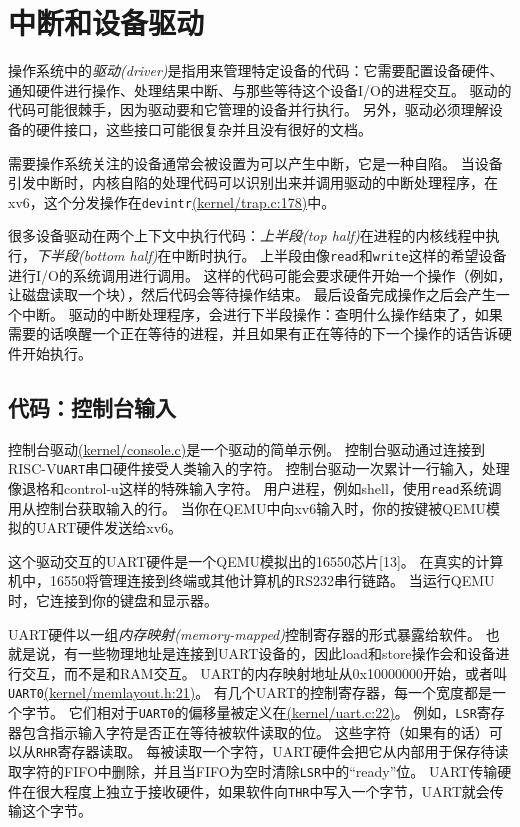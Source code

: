 \chapter{中断和设备驱动}

操作系统中的\emph{驱动(driver)}是指用来管理特定设备的代码：它需要配置设备硬件、通知硬件进行操作、处理结果中断、与那些等待这个设备I/O的进程交互。
驱动的代码可能很棘手，因为驱动要和它管理的设备并行执行。
另外，驱动必须理解设备的硬件接口，这些接口可能很复杂并且没有很好的文档。

需要操作系统关注的设备通常会被设置为可以产生中断，它是一种自陷。
当设备引发中断时，内核自陷的处理代码可以识别出来并调用驱动的中断处理程序，在xv6，这个分发操作在\texttt{devintr}\href{https://github.com/mit-pdos/xv6-riscv/blob/risc/kernel/trap.c#L178}{(kernel/trap.c:178)}中。

很多设备驱动在两个上下文中执行代码：\emph{上半段(top half)}在进程的内核线程中执行，\emph{下半段(bottom half)}在中断时执行。
上半段由像\texttt{read}和\texttt{write}这样的希望设备进行I/O的系统调用进行调用。
这样的代码可能会要求硬件开始一个操作（例如，让磁盘读取一个块），然后代码会等待操作结束。
最后设备完成操作之后会产生一个中断。
驱动的中断处理程序，会进行下半段操作：查明什么操作结束了，如果需要的话唤醒一个正在等待的进程，并且如果有正在等待的下一个操作的话告诉硬件开始执行。

\section{代码：控制台输入}
控制台驱动\href{https://github.com/mit-pdos/xv6-riscv/blob/risc/kernel/console.c}{(kernel/console.c)}是一个驱动的简单示例。
控制台驱动通过连接到RISC-V\texttt{UART}串口硬件接受人类输入的字符。
控制台驱动一次累计一行输入，处理像退格和control-u这样的特殊输入字符。
用户进程，例如shell，使用\texttt{read}系统调用从控制台获取输入的行。
当你在QEMU中向xv6输入时，你的按键被QEMU模拟的UART硬件发送给xv6。

这个驱动交互的UART硬件是一个QEMU模拟出的16550芯片[13]。
在真实的计算机中，16550将管理连接到终端或其他计算机的RS232串行链路。
当运行QEMU时，它连接到你的键盘和显示器。

UART硬件以一组\emph{内存映射(memory-mapped)}控制寄存器的形式暴露给软件。
也就是说，有一些物理地址是连接到UART设备的，因此load和store操作会和设备进行交互，而不是和RAM交互。
UART的内存映射地址从0x10000000开始，或者叫\texttt{UART0}\href{https://github.com/mit-pdos/xv6-riscv/blob/risc/kernel/memlayout.h#L21}{(kernel/memlayout.h:21)}。
有几个UART的控制寄存器，每一个宽度都是一个字节。
它们相对于\texttt{UART0}的偏移量被定义在\href{https://github.com/mit-pdos/xv6-riscv/blob/risc/kernel/uart.c#L22}{(kernel/uart.c:22)}。
例如，\texttt{LSR}寄存器包含指示输入字符是否正在等待被软件读取的位。
这些字符（如果有的话）可以从\texttt{RHR}寄存器读取。
每被读取一个字符，UART硬件会把它从内部用于保存待读取字符的FIFO中删除，并且当FIFO为空时清除\texttt{LSR}中的“ready”位。
UART传输硬件在很大程度上独立于接收硬件，如果软件向\texttt{THR}中写入一个字节，UART就会传输这个字节。

